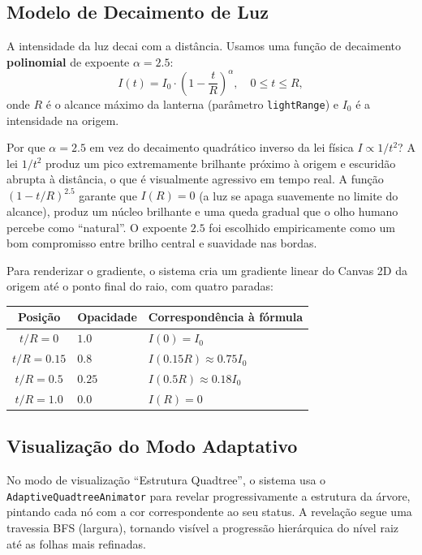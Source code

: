 \documentclass[11pt,a4paper]{article}
\theoremstyle{plain}
\theoremstyle{definition}
\begin{document}
\subsection{Modelo de Decaimento de Luz}
\label{subsec:decaimento}

A intensidade da luz decai com a distância. Usamos uma função de decaimento
\textbf{polinomial} de expoente $\alpha = 2.5$:
\[
    I(t) = I_0 \cdot \left(1 - \frac{t}{R}\right)^\alpha, \quad 0 \leq t \leq R,
\]
onde $R$ é o alcance máximo da lanterna (parâmetro \texttt{lightRange}) e $I_0$
é a intensidade na origem.

\begin{tcolorbox}[motivacao]
Por que $\alpha = 2.5$ em vez do decaimento quadrático inverso da lei física
$I \propto 1/t^2$? A lei $1/t^2$ produz um pico extremamente brilhante próximo
à origem e escuridão abrupta à distância, o que é visualmente agressivo em tempo
real. A função $(1 - t/R)^{2.5}$ garante que $I(R) = 0$ (a luz se apaga suavemente
no limite do alcance), produz um núcleo brilhante e uma queda gradual que o olho
humano percebe como ``natural''. O expoente $2.5$ foi escolhido empiricamente
como um bom compromisso entre brilho central e suavidade nas bordas.
\end{tcolorbox}

Para renderizar o gradiente, o sistema cria um gradiente linear do Canvas 2D da
origem até o ponto final do raio, com quatro paradas:

\begin{center}
\begin{tabular}{cll}
\toprule
\textbf{Posição} & \textbf{Opacidade} & \textbf{Correspondência à fórmula} \\
\midrule
$t/R = 0$    & $1.0$  & $I(0) = I_0$ \\
$t/R = 0.15$ & $0.8$  & $I(0.15R) \approx 0.75 I_0$ \\
$t/R = 0.5$  & $0.25$ & $I(0.5R) \approx 0.18 I_0$ \\
$t/R = 1.0$  & $0.0$  & $I(R) = 0$ \\
\bottomrule
\end{tabular}
\end{center}

\subsection{Visualização do Modo Adaptativo}

No modo de visualização ``Estrutura Quadtree'', o sistema usa o
\texttt{AdaptiveQuadtreeAnimator} para revelar progressivamente a estrutura da
árvore, pintando cada nó com a cor correspondente ao seu status. A revelação
segue uma travessia BFS (largura), tornando visível a progressão hierárquica do
nível raiz até as folhas mais refinadas.
\end{document}
